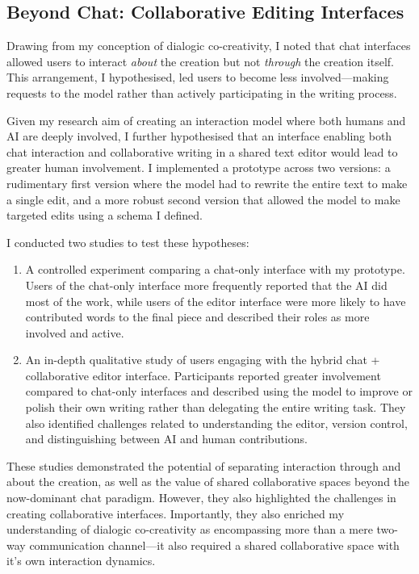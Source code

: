 \subsection{Beyond Chat: Collaborative Editing Interfaces}

Drawing from my conception of dialogic co-creativity, I noted that chat interfaces allowed users to interact \textit{about} the creation but not \textit{through} the creation itself. This arrangement, I hypothesised, led users to become less involved—making requests to the model rather than actively participating in the writing process.

Given my research aim of creating an interaction model where both humans and AI are deeply involved, I further hypothesised that an interface enabling both chat interaction and collaborative writing in a shared text editor would lead to greater human involvement. I implemented a prototype across two versions: a rudimentary first version where the model had to rewrite the entire text to make a single edit, and a more robust second version that allowed the model to make targeted edits using a schema I defined.

I conducted two studies to test these hypotheses:

\begin{enumerate}
    \item A controlled experiment comparing a chat-only interface with my prototype. Users of the chat-only interface more frequently reported that the AI did most of the work, while users of the editor interface were more likely to have contributed words to the final piece and described their roles as more involved and active.
    \item An in-depth qualitative study of users engaging with the hybrid chat + collaborative editor interface. Participants reported greater involvement compared to chat-only interfaces and described using the model to improve or polish their own writing rather than delegating the entire writing task. They also identified challenges related to understanding the editor, version control, and distinguishing between AI and human contributions.
\end{enumerate}

These studies demonstrated the potential of separating interaction through and about the creation, as well as the value of shared collaborative spaces beyond the now-dominant chat paradigm. However, they also highlighted the challenges in creating collaborative interfaces. Importantly, they also enriched my understanding of dialogic co-creativity as encompassing more than a mere two-way communication channel—it also required a shared collaborative space with it's own interaction dynamics.


